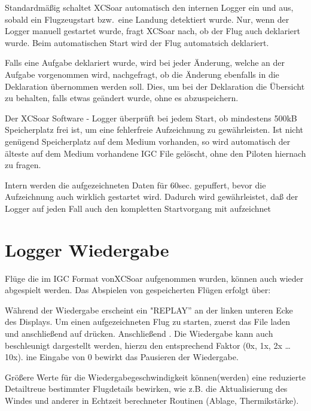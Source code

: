 Standardmäßig schaltet \textsf{XCSoar}  automatisch den internen Logger ein und aus, sobald ein Flugzeugstart bzw.\ eine Landung  detektiert wurde.
Nur, wenn der Logger manuell gestartet wurde, fragt \textsf{XCSoar} nach, ob der Flug auch deklariert wurde. Beim automatischen Start wird der Flug automatsich deklariert.

Falls eine Aufgabe deklariert wurde, wird bei jeder Änderung, welche an der Aufgabe vorgenommen wird, nachgefragt, ob die Änderung ebenfalls in die Deklaration übernommen werden soll. Dies, um bei der Deklaration die Übersicht zu behalten, falls etwas geändert wurde, ohne es abzuspeichern.

Der \textsf{XCSoar}  Software - Logger überprüft bei jedem Start, ob mindestens 500kB Speicherplatz frei ist, um eine fehlerfreie Aufzeichnung zu gewährleisten. \textcolor[rgb]{0.00,0.25,0.50}{Ist nicht genügend Speicherplatz auf dem Medium vorhanden, so wird automatisch der älteste auf dem Medium vorhandene IGC File gelöscht, ohne den Piloten hiernach zu fragen.}

Intern werden die aufgezeichneten Daten für 60sec. gepuffert, bevor die Aufzeichnung auch wirklich gestartet wird.  Dadurch wird gewährleistet, daß der Logger auf jeden Fall auch den kompletten Startvorgang mit aufzeichnet

\section{Logger Wiedergabe}
Flüge die im IGC Format von\textsf{XCSoar} aufgenommen wurden,  können   auch wieder abgespielt werden. Das Abspielen von gespeicherten Flügen erfolgt über:

Während der Wiedergabe erscheint ein "REPLAY'' an der linken unteren Ecke des Displays.
Um einen aufgezeichneten Flug zu starten, zuerst das File laden und anschließend auf  drücken. Anschließend . Die Wiedergabe kann auch beschleunigt dargestellt werden, hierzu den entsprechend Faktor  (0x, 1x, 2x \dots 10x).
 ine Eingabe von 0 bewirkt das Pausieren der Wiedergabe.

Größere Werte für die Wiedergabegeschwindigkeit können(werden) eine reduzierte Detailtreue  bestimmter Flugdetails bewirken, wie z.B. die Aktualisierung des Windes und anderer in Echtzeit berechneter Routinen (Ablage, Thermikstärke).

